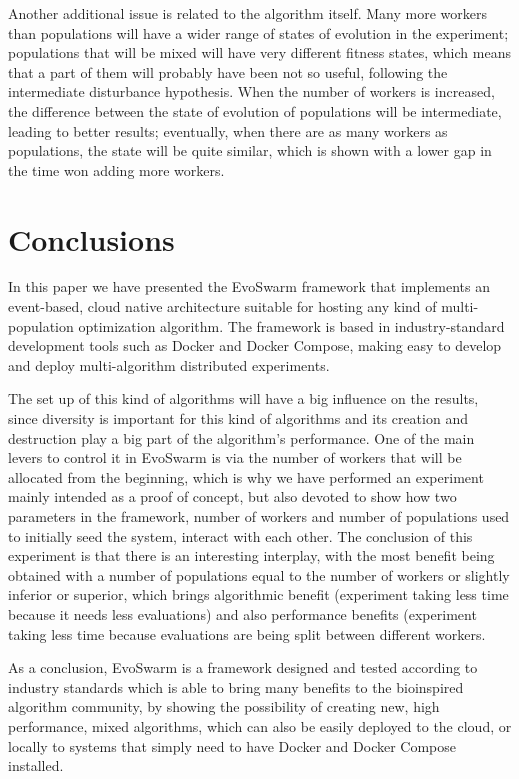 \documentclass[review]{elsarticle}
\begin{document}
Another additional issue is related to the algorithm itself. Many more
workers than populations will have a wider range of states of
evolution in the experiment; populations that will be mixed will have
very different fitness states, which means that a part of them will
probably have been not so useful, following the intermediate
disturbance hypothesis. When the number of workers is increased, the
difference between the state of evolution of populations will be
intermediate, leading to better results; eventually, when there are as
many workers as populations, the state will be quite similar, which is
shown with a lower gap in the time won adding more workers.


  

\section{Conclusions} 
\label{conclusions}

In this paper we have presented the EvoSwarm framework that implements
an event-based, cloud native architecture suitable for hosting any
kind of multi-population optimization algorithm. The framework is
based in industry-standard development tools such as Docker and Docker
Compose, making easy to develop and deploy multi-algorithm distributed
experiments.

The set up of this kind of algorithms will have a big influence on the
results, since diversity is important for this kind of algorithms and
its creation and destruction play a big part of the algorithm's
performance. One of the main levers to control it in EvoSwarm is via
the number of workers that will be allocated from the beginning, which
is why we have performed an experiment mainly intended as a proof of
concept, but also devoted to show how two parameters in the framework,
number of workers and number of populations used to initially seed the
system, interact with each other. The conclusion of this experiment is
that there is an interesting interplay, with the most benefit being
obtained with a number of populations equal to the number of workers
or slightly inferior or superior, which brings algorithmic benefit
(experiment taking less time because it needs less evaluations) and
also performance benefits (experiment taking less time because
evaluations are being split between different workers.

As a conclusion, EvoSwarm is a framework designed and tested according
to industry standards which is able to bring many benefits to the
bioinspired algorithm community, by showing the possibility of
creating new, high performance, mixed algorithms, which can also be
easily deployed to the cloud, or locally to systems that simply need
to have Docker and Docker Compose installed.
\end{document}
